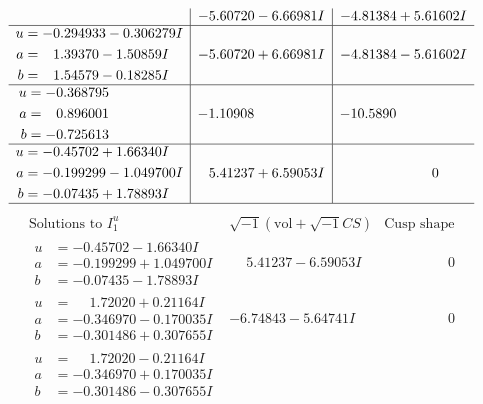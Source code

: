 \documentclass[1p]{elsarticle_modified}
\theoremstyle{definition}
\newcommand{\I}{\sqrt{-1}}
\begin{document}
$$\begin{array}{c|c|c}
 & -5.60720 - 6.66981 I & -4.81384 + 5.61602 I \\ \hline\begin{aligned}
u &= -0.294933 - 0.306279 I \\
a &= \phantom{-}1.39370 - 1.50859 I \\
b &= \phantom{-}1.54579 - 0.18285 I\end{aligned}
 & -5.60720 + 6.66981 I & -4.81384 - 5.61602 I \\ \hline\begin{aligned}
u &= -0.368795\phantom{ +0.000000I} \\
a &= \phantom{-}0.896001\phantom{ +0.000000I} \\
b &= -0.725613\phantom{ +0.000000I}\end{aligned}
 & -1.10908\phantom{ +0.000000I} & -10.5890\phantom{ +0.000000I} \\ \hline\begin{aligned}
u &= -0.45702 + 1.66340 I \\
a &= -0.199299 - 1.049700 I \\
b &= -0.07435 + 1.78893 I\end{aligned}
 & \phantom{-}5.41237 + 6.59053 I & \phantom{-0.000000 } 0\\
 \hline 
 \end{array}$$\newpage$$\begin{array}{c|c|c}  
\text{Solutions to }I^u_{1}& \I (\text{vol} + \sqrt{-1}CS) & \text{Cusp shape}\\
 \hline 
\begin{aligned}
u &= -0.45702 - 1.66340 I \\
a &= -0.199299 + 1.049700 I \\
b &= -0.07435 - 1.78893 I\end{aligned}
 & \phantom{-}5.41237 - 6.59053 I & \phantom{-0.000000 } 0 \\ \hline\begin{aligned}
u &= \phantom{-}1.72020 + 0.21164 I \\
a &= -0.346970 - 0.170035 I \\
b &= -0.301486 + 0.307655 I\end{aligned}
 & -6.74843 - 5.64741 I & \phantom{-0.000000 } 0 \\ \hline\begin{aligned}
u &= \phantom{-}1.72020 - 0.21164 I \\
a &= -0.346970 + 0.170035 I \\
b &= -0.301486 - 0.307655 I\end{aligned}

\end{array}$$
\end{document}
